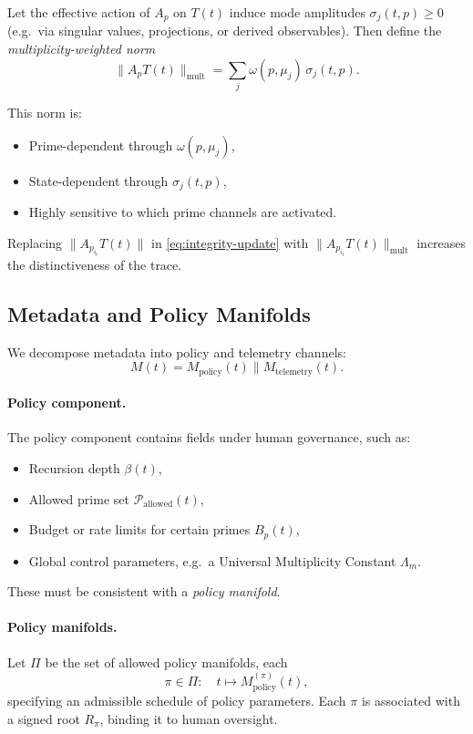 \documentclass[11pt]{article}
\begin{document}
Let the effective action of \(A_p\) on \(T(t)\) induce mode amplitudes \(\sigma_j(t,p)\ge 0\) (e.g.\ via singular values, projections, or derived observables).
Then define the \emph{multiplicity-weighted norm}
\begin{equation}
  \|A_p T(t)\|_{\text{mult}}
  = \sum_j \omega(p,\mu_j) \, \sigma_j(t,p).
  \label{eq:multiplicity-norm}
\end{equation}

This norm is:
\begin{itemize}[leftmargin=1.5em]
  \item Prime-dependent through \(\omega(p,\mu_j)\),
  \item State-dependent through \(\sigma_j(t,p)\),
  \item Highly sensitive to which prime channels are activated.
\end{itemize}

Replacing \(\|A_{p_{i_t}}T(t)\|\) in \eqref{eq:integrity-update} with \(\|A_{p_{i_t}}T(t)\|_{\text{mult}}\) increases the distinctiveness of the trace.

\subsection{Metadata and Policy Manifolds}

We decompose metadata into policy and telemetry channels:
\[
  M(t) = M_{\text{policy}}(t) \parallel M_{\text{telemetry}}(t).
\]

\paragraph{Policy component.}
The policy component contains fields under human governance, such as:
\begin{itemize}[leftmargin=1.5em]
  \item Recursion depth \(\beta(t)\),
  \item Allowed prime set \(\mathcal{P}_{\text{allowed}}(t)\),
  \item Budget or rate limits for certain primes \(B_{p}(t)\),
  \item Global control parameters, e.g.\ a Universal Multiplicity Constant \(\Lambda_m\).
\end{itemize}
These must be consistent with a \emph{policy manifold}.

\paragraph{Policy manifolds.}
Let \(\Pi\) be the set of allowed policy manifolds, each
\[
  \pi \in \Pi: \quad t \mapsto M_{\text{policy}}^{(\pi)}(t),
\]
specifying an admissible schedule of policy parameters.
Each \(\pi\) is associated with a signed root \(R_\pi\), binding it to human oversight.
\end{document}
